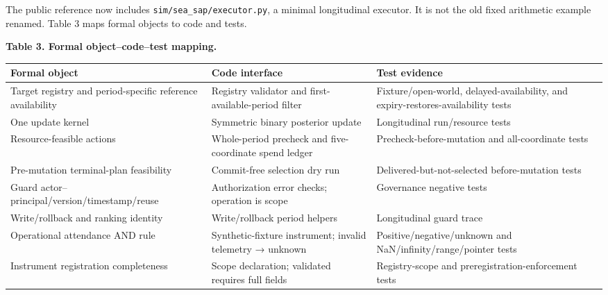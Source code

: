 \documentclass[
  11pt]{article}
\begin{document}
The public reference now includes \texttt{sim/sea\_sap/executor.py}, a
minimal longitudinal executor. It is not the old fixed arithmetic
example renamed. Table 3 maps formal objects to code and tests.

\textbf{Table 3. Formal object--code--test mapping.}

\begin{longtable}[]{@{}
  >{\raggedright\arraybackslash}p{}
  >{\raggedright\arraybackslash}p{}
  >{\raggedright\arraybackslash}p{}@{}}
\toprule\noalign{}
\begin{minipage}[b]{\linewidth}\raggedright
Formal object
\end{minipage} & \begin{minipage}[b]{\linewidth}\raggedright
Code interface
\end{minipage} & \begin{minipage}[b]{\linewidth}\raggedright
Test evidence
\end{minipage} \\
\midrule\noalign{}
\endhead
\bottomrule\noalign{}
\endlastfoot
Target registry and period-specific reference availability & Registry
validator and first-available-period filter & Fixture/open-world,
delayed-availability, and expiry-restores-availability tests \\
One update kernel & Symmetric binary posterior update & Longitudinal
run/resource tests \\
Resource-feasible actions & Whole-period precheck and five-coordinate
spend ledger & Precheck-before-mutation and all-coordinate tests \\
Pre-mutation terminal-plan feasibility & Commit-free selection dry run &
Delivered-but-not-selected before-mutation tests \\
Guard actor--principal/version/timestamp/reuse & Authorization error
checks; operation is scope & Governance negative tests \\
Write/rollback and ranking identity & Write/rollback period helpers &
Longitudinal guard trace \\
Operational attendance AND rule & Synthetic-fixture instrument; invalid
telemetry → unknown & Positive/negative/unknown and
NaN/infinity/range/pointer tests \\
Instrument registration completeness & Scope declaration; validated
requires full fields & Registry-scope and preregistration-enforcement
tests \\

\end{longtable}
\end{document}
